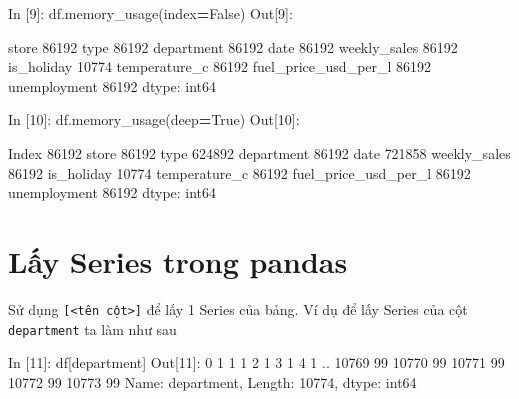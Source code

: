 \documentclass[
]{book}
\newenvironment{Shaded}{\begin{snugshade}}{\end{snugshade}}
\newcommand{\BuiltInTok}[1]{#1}
\newcommand{\DecValTok}[1]{\textcolor[rgb]{0.00,0.00,0.81}{#1}}
\newcommand{\NormalTok}[1]{#1}
\newcommand{\OperatorTok}[1]{\textcolor[rgb]{0.81,0.36,0.00}{\textbf{#1}}}
\newcommand{\StringTok}[1]{\textcolor[rgb]{0.31,0.60,0.02}{#1}}
\newcommand{\VariableTok}[1]{\textcolor[rgb]{0.00,0.00,0.00}{#1}}
\begin{document}
\begin{Shaded}
\begin{Highlighting}[]
\NormalTok{In [}\DecValTok{9}\NormalTok{]: df.memory\_usage(index}\OperatorTok{=}\VariableTok{False}\NormalTok{)}
\NormalTok{Out[}\DecValTok{9}\NormalTok{]: }

\NormalTok{store                   }\DecValTok{86192}
\BuiltInTok{type}                    \DecValTok{86192}
\NormalTok{department              }\DecValTok{86192}
\NormalTok{date                    }\DecValTok{86192}
\NormalTok{weekly\_sales            }\DecValTok{86192}
\NormalTok{is\_holiday              }\DecValTok{10774}
\NormalTok{temperature\_c           }\DecValTok{86192}
\NormalTok{fuel\_price\_usd\_per\_l    }\DecValTok{86192}
\NormalTok{unemployment            }\DecValTok{86192}
\NormalTok{dtype: int64}

\NormalTok{In [}\DecValTok{10}\NormalTok{]: df.memory\_usage(deep}\OperatorTok{=}\VariableTok{True}\NormalTok{) }
\NormalTok{Out[}\DecValTok{10}\NormalTok{]: }

\NormalTok{Index                    }\DecValTok{86192}
\NormalTok{store                    }\DecValTok{86192}
\BuiltInTok{type}                    \DecValTok{624892}
\NormalTok{department               }\DecValTok{86192}
\NormalTok{date                    }\DecValTok{721858}
\NormalTok{weekly\_sales             }\DecValTok{86192}
\NormalTok{is\_holiday               }\DecValTok{10774}
\NormalTok{temperature\_c            }\DecValTok{86192}
\NormalTok{fuel\_price\_usd\_per\_l     }\DecValTok{86192}
\NormalTok{unemployment             }\DecValTok{86192}
\NormalTok{dtype: int64}
\end{Highlighting}
\end{Shaded}

\hypertarget{lux1ea5y-series-trong-pandas}{%
\section{Lấy Series trong pandas}\label{lux1ea5y-series-trong-pandas}}

Sử dụng \texttt{{[}\textless{}tên\ cột\textgreater{}{]}} để lấy 1 Series của bảng. Ví dụ để lấy Series của cột \texttt{department} ta làm như sau

\begin{Shaded}
\begin{Highlighting}[]
\NormalTok{In [}\DecValTok{11}\NormalTok{]: df[}\StringTok{\textquotesingle{}department\textquotesingle{}}\NormalTok{]}
\NormalTok{Out[}\DecValTok{11}\NormalTok{]: }
\DecValTok{0}         \DecValTok{1}
\DecValTok{1}         \DecValTok{1}
\DecValTok{2}         \DecValTok{1}
\DecValTok{3}         \DecValTok{1}
\DecValTok{4}         \DecValTok{1}
\NormalTok{         ..}
\DecValTok{10769}    \DecValTok{99}
\DecValTok{10770}    \DecValTok{99}
\DecValTok{10771}    \DecValTok{99}
\DecValTok{10772}    \DecValTok{99}
\DecValTok{10773}    \DecValTok{99}
\NormalTok{Name: department, Length: }\DecValTok{10774}\NormalTok{, dtype: int64}
\end{Highlighting}
\end{Shaded}
\end{document}
